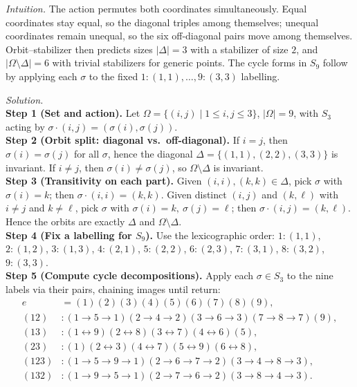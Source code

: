\documentclass[11pt]{article}
\theoremstyle{definition}
\begin{document}
\newpage

\dotfill

\emph{Intuition.} The action permutes both coordinates simultaneously. Equal coordinates stay equal, so the diagonal triples among themselves; unequal coordinates remain unequal, so the six off-diagonal pairs move among themselves. Orbit–stabilizer then predicts sizes $|\Delta|=3$ with a stabilizer of size $2$, and $|\Omega\setminus\Delta|=6$ with trivial stabilizers for generic points. The cycle forms in $S_9$ follow by applying each $\sigma$ to the fixed $1\!:\!(1,1),\dots,9\!:\!(3,3)$ labelling.\\

\dotfill

\emph{Solution.}\\
\textbf{Step 1 (Set and action).} Let $\Omega=\{(i,j)\mid 1\le i,j\le 3\}$, $|\Omega|=9$, with $S_3$ acting by $\sigma\!\cdot\!(i,j)=(\sigma(i),\sigma(j))$.\\
\textbf{Step 2 (Orbit split: diagonal vs.\ off-diagonal).} If $i=j$, then $\sigma(i)=\sigma(j)$ for all $\sigma$, hence the diagonal $\Delta=\{(1,1),(2,2),(3,3)\}$ is invariant. If $i\ne j$, then $\sigma(i)\ne \sigma(j)$, so $\Omega\setminus\Delta$ is invariant.\\
\textbf{Step 3 (Transitivity on each part).} Given $(i,i),(k,k)\in\Delta$, pick $\sigma$ with $\sigma(i)=k$; then $\sigma\!\cdot\!(i,i)=(k,k)$. Given distinct $(i,j)$ and $(k,\ell)$ with $i\ne j$ and $k\ne \ell$, pick $\sigma$ with $\sigma(i)=k,\ \sigma(j)=\ell$; then $\sigma\!\cdot\!(i,j)=(k,\ell)$. Hence the orbits are exactly $\Delta$ and $\Omega\setminus\Delta$.\\
\textbf{Step 4 (Fix a labelling for $S_9$).} Use the lexicographic order: $1:(1,1)$, $2:(1,2)$, $3:(1,3)$, $4:(2,1)$, $5:(2,2)$, $6:(2,3)$, $7:(3,1)$, $8:(3,2)$, $9:(3,3)$.\\
\textbf{Step 5 (Compute cycle decompositions).} Apply each $\sigma\in S_3$ to the nine labels via their pairs, chaining images until return:
\[
\begin{aligned}
e&=(1)(2)(3)(4)(5)(6)(7)(8)(9),\\
(12)&:(1\!\to\!5\!\to\!1)(2\!\to\!4\!\to\!2)(3\!\to\!6\!\to\!3)(7\!\to\!8\!\to\!7)(9),\\
(13)&:(1\!\leftrightarrow\!9)(2\!\leftrightarrow\!8)(3\!\leftrightarrow\!7)(4\!\leftrightarrow\!6)(5),\\
(23)&:(1)(2\!\leftrightarrow\!3)(4\!\leftrightarrow\!7)(5\!\leftrightarrow\!9)(6\!\leftrightarrow\!8),\\
(123)&:(1\!\to\!5\!\to\!9\!\to\!1)(2\!\to\!6\!\to\!7\!\to\!2)(3\!\to\!4\!\to\!8\!\to\!3),\\
(132)&:(1\!\to\!9\!\to\!5\!\to\!1)(2\!\to\!7\!\to\!6\!\to\!2)(3\!\to\!8\!\to\!4\!\to\!3).
\end{aligned}
\]
\end{document}
